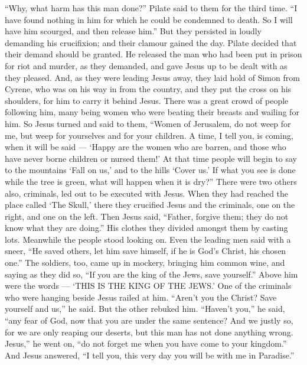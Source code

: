  ``Why, what harm has this man done?'' Pilate said to them
for the third time. ``I have found nothing in him for which he could be
condemned to death. So I will have him scourged, and then release him.''
 But they persisted in loudly demanding his crucifixion;
and their clamour gained the day.  Pilate decided that
their demand should be granted.  He released the man who
had been put in prison for riot and murder, as they demanded, and gave
Jesus up to be dealt with as they pleased.  And, as they
were leading Jesus away, they laid hold of Simon from Cyrene, who was on
his way in from the country, and they put the cross on his shoulders,
for him to carry it behind Jesus.  There was a great crowd
of people following him, many being women who were beating their breasts
and wailing for him.  So Jesus turned and said to them,
``Women of Jerusalem, do not weep for me, but weep for yourselves and
for your children.  A time, I tell you, is coming, when it
will be said --- `Happy are the women who are barren, and those who have
never borne children or nursed them!'  At that time people
will begin to say to the mountains `Fall on us,' and to the hills `Cover
us.'  If what you see is done while the tree is green, what
will happen when it is dry?''  There were two others also,
criminals, led out to be executed with Jesus.  When they
had reached the place called `The Skull,' there they crucified Jesus and
the criminals, one on the right, and one on the left.  Then
Jesus said, ``Father, forgive them; they do not know what they are
doing.'' His clothes they divided amongst them by casting lots.
 Meanwhile the people stood looking on. Even the leading
men said with a sneer, ``He saved others, let him save himself, if he is
God's Christ, his chosen one.''  The soldiers, too, came up
in mockery, bringing him common wine,  and saying as they
did so, ``If you are the king of the Jews, save yourself.''
 Above him were the words --- `THIS IS THE KING OF THE
JEWS.'  One of the criminals who were hanging beside Jesus
railed at him. ``Aren't you the Christ? Save yourself and us,'' he said.
 But the other rebuked him. ``Haven't you,'' he said, ``any
fear of God, now that you are under the same sentence?  And
we justly so, for we are only reaping our deserts, but this man has not
done anything wrong.  Jesus,'' he went on, ``do not forget
me when you have come to your kingdom.''  And Jesus
answered, ``I tell you, this very day you will be with me in Paradise.''

